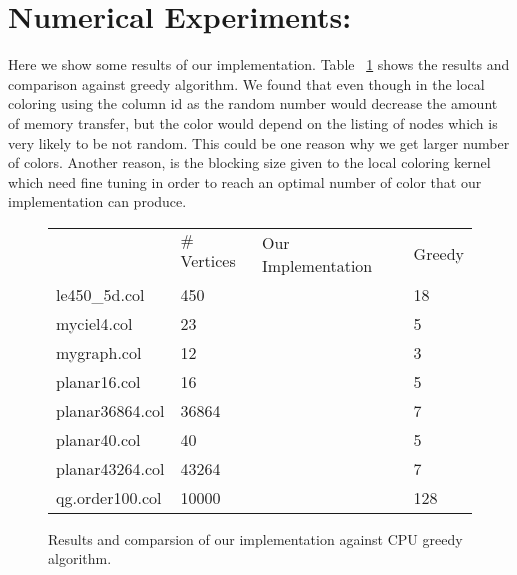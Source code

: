 \documentclass[12pt] {article}
\begin{document}

\section*{Numerical Experiments:}
Here we show some results of our implementation. Table ~\ref{tab:results} shows the results and comparison against greedy algorithm. We found that even though in the local coloring using the column id as the random number would decrease the amount of memory transfer, but the color would depend on the listing of nodes which is very likely to be not random. This could be one reason why we get larger number of colors. Another reason, is the blocking size given to the local coloring kernel which need fine tuning in order to reach an optimal number of color that our implementation can produce. 


\begin{figure}[tbh]
 \centering    
\begin{tabular}{ |p{4cm}||p{3cm}|| p{4cm}|p{4cm}|}
 \hline
   & $\#$Vertices & Our Implementation &  Greedy \\ 
     
     \hhline{|=||=||=|=|}
 \hline
 le450\_5d.col &450       &   &18 \\
 \hline
 myciel4.col &  23       &   &5 \\
 \hline
  mygraph.col & 12       &  &3 \\
 \hline
  planar16.col &16        &   &5 \\
 \hline
  planar36864.col & 36864     &   &7 \\
 \hline
   planar40.col &  40      &   & 5\\
 \hline
   planar43264.col & 43264     &   & 7\\
 \hline
   qg.order100.col & 10000     &  &128 \\
 \hline
 
\end{tabular} 
\caption{Results and comparsion of our implementation against CPU greedy algorithm.}
   \label{tab:results}
\end{figure} 
\end{document}
